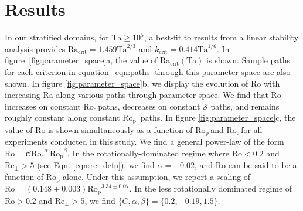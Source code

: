 \documentclass[twocolumn, amsmath, amsfonts, amssymb, trackchanges]{aastex62}
\newcommand{\pro}{\ensuremath{\text{Ro}_{\text{p}}}}
\newcommand{\con}{\ensuremath{\text{Ro}_{\text{c}}}}
\begin{document}
\section{Results}
\label{sec:results}
In our stratified domains, for $\text{Ta} \geq 10^5$, 
a best-fit to results from a linear stability
analysis provides $\text{Ra}_{\text{crit}} = 1.459\text{Ta}^{2/3}$ 
and $k_{\text{crit}} = 0.414\text{Ta}^{1/6}$.
In figure~\ref{fig:parameter_space}a, the value of Ra$_{\text{crit}}(\text{Ta})$
is shown. Sample paths for
each criterion in equation~\ref{eqn:paths} through
this parameter space are also shown.
In figure \ref{fig:parameter_space}b, we display the evolution of Ro
with increasing Ra along various paths through parameter space.
We find that Ro increases on constant \con$\,$paths, decreases on constant $\mathcal{S}$
paths, and remains roughly constant along constant \pro$\,$ paths.
In figure \ref{fig:parameter_space}c, the value of Ro is shown simultaneously as
a function of \pro$\,$and \con$\,$for all experiments conducted in this study.
We find a general power-law of the form \mbox{$\text{Ro} = \mathcal{C} \con^{\alpha}\,\pro^{\beta}$}.
In the rotationally-dominated regime where $\text{Ro} < 0.2$ and 
$\text{Re}_{\perp} > 5$ (see Eqn. \ref{eqn:re_defn}),
we find $\alpha = -0.02$, and $\text{Ro}$ can be said to be a function
of $\pro$ alone. Under this assumption, we report a scaling of $\text{Ro} = (0.148 \pm 0.003) \pro^{3.34 \pm 0.07}$.
In the less rotationally dominated regime of $\text{Ro} > 0.2$ and $\text{Re}_{\perp} > 5$, 
we find $\{C, \alpha, \beta\} = \{0.2, -0.19, 1.5\}$.
\end{document}
